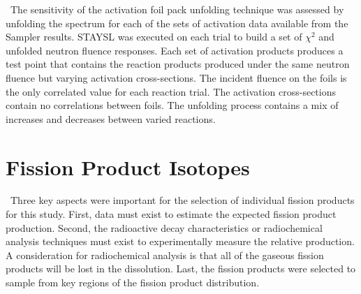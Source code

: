 \ The sensitivity of the activation foil pack unfolding technique was assessed by unfolding the spectrum for each of the sets of activation data available from the Sampler results. 
STAYSL was executed on each trial to build a set of $\chi^{2}$ and unfolded neutron fluence responses.
Each set of activation products produces a test point that contains the reaction products produced under the same neutron fluence but varying activation cross-sections. 
The incident fluence on the foils is the only correlated value for each reaction trial.
The activation cross-sections contain no correlations between foils.
The unfolding process contains a mix of increases and decreases between varied reactions. 

\section{Fission Product Isotopes}

\ Three key aspects were important for the selection of individual fission products for this study. 
First, data must exist to estimate the expected fission product production. 
Second, the radioactive decay characteristics or radiochemical analysis techniques must exist to experimentally measure the relative production.
A consideration for radiochemical analysis is that all of the gaseous fission products will be lost in the dissolution. 
Last, the fission products were selected to sample from key regions of the fission product distribution. 

